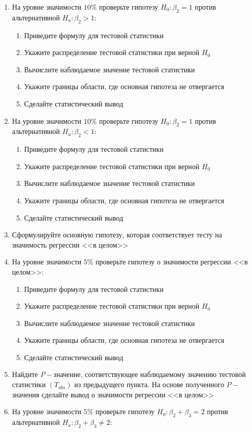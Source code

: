 \documentclass[pdftex,11pt,openany]{book}\usepackage[]{graphicx}\usepackage[]{color}
\begin{document}
\begin{problem}
\begin{enumerate}
\item На уровне значимости $10\%$ проверьте гипотезу $H_0: \beta_2 = 1$ против альтернативной $H_a: \beta_2 > 1$:
\begin{enumerate}
\item Приведите формулу для тестовой статистики 
\item Укажите распределение тестовой статистики при верной $H_0$
\item Вычислите наблюдаемое значение тестовой статистики
\item Укажите границы области, где основная гипотеза не отвергается
\item Сделайте статистический вывод
\end{enumerate}
\item На уровне значимости $10\%$ проверьте гипотезу $H_0: \beta_2 = 1$ против альтернативной $H_a: \beta_2 < 1$:
\begin{enumerate}
\item Приведите формулу для тестовой статистики 
\item Укажите распределение тестовой статистики при верной $H_0$
\item Вычислите наблюдаемое значение тестовой статистики
\item Укажите границы области, где основная гипотеза не отвергается
\item Сделайте статистический вывод
\end{enumerate}
\item Сформулируйте основную гипотезу, которая соответствует тесту на значимость регрессии <<в целом>>
\item На уровне значимости $5\%$ проверьте гипотезу о значимости регрессии <<в целом>>:
\begin{enumerate}
\item Приведите формулу для тестовой статистики 
\item Укажите распределение тестовой статистики при верной $H_0$
\item Вычислите наблюдаемое значение тестовой статистики
\item Укажите границы области, где основная гипотеза не отвергается
\item Сделайте статистический вывод
\end{enumerate}
\item Найдите $P-$значение, соответствующее наблюдаемому значению тестовой статистики $(T_{obs})$ из предыдущего пункта. На основе полученного $P-$значения сделайте вывод о значимости регрессии <<в целом>>
\item На уровне значимости $5\%$ проверьте гипотезу  $H_0: \beta_2 + \beta_3 = 2$ против альтернативной $H_a: \beta_2 + \beta_3 \not= 2$:

\end{enumerate}
\end{problem}
\end{document}
